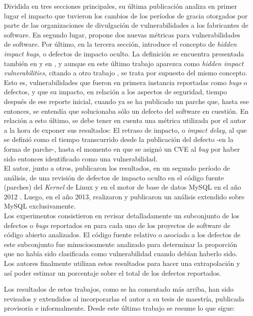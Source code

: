 \documentclass[11pt,a4paper]{article}
\begin{document}
Dividida en tres secciones principales, su última publicación analiza en primer lugar el impacto que tuvieron los cambios de los períodos de gracia otorgados por parte de las organizaciones de divulgación de vulnerabilidades a los fabricantes de software. En segundo lugar, propone dos nuevas métricas para vulnerabilidades de software. Por último, en la tercera sección, introduce el concepto de \textit{hidden impact bugs}, o defectos de impacto oculto. La definición se encuentra presentada también en \cite{Jason2} y en \cite{Jason4}, y aunque en este último trabajo aparezca como \textit{hidden impact vulnerabilities}, citando a otro trabajo \cite{Arnold}, se trata por supuesto del mismo concepto. Esto es, vulnerabilidades que fueron en primera instancia reportadas como \textit{bugs} o defectos, y que su impacto, en relación a los aspectos de seguridad, tiempo después de ese reporte inicial, cuando ya se ha publicado un parche que, hasta ese entonces, se entendía que solucionaba sólo un defecto del software en cuestión. En relación a esto último, se debe tener en cuenta una métrica utilizada por el autor a la hora de exponer sus resultados:  El retraso de impacto, o \textit{impact delay}, al que se definió como el tiempo transcurrido desde la publicación del defecto -en la forma de parche-, hasta el momento en que se asignó un CVE al \textit{bug} por haber sido entonces identificado como una vulnerabilidad.
\\

El autor, junto a otros, publicaron los resultados, en un segundo período de análisis, de una revisión de defectos de impacto oculto en el código fuente (parches) del \textit{Kernel} de Linux y en el motor de base de datos MySQL en el año 2012 \cite{Jason4}. Luego, en el año 2013, realizaron y publicaron \cite{Jason2} un análisis extendido sobre MySQL exclusivamente.
\\

Los experimentos consistieron en revisar detalladamente un subconjunto de los defectos o \textit{bugs} reportados en para cada uno de los proyectos de software de código abierto analizados. El código fuente relativo o asociado a los defectos de este subconjunto fue minuciosamente analizado para determinar la proporción que no había sido clasificada como vulnerabilidad cuando debían haberlo sido. Los autores finalmente utilizan estos resultados para hacer una extrapolación y así poder estimar un porcentaje sobre el total de los defectos reportados.

Los resultados de estos trabajos, como se ha comentado más arriba, han sido revisados y extendidos al incorporarlas el autor a su tesis de maestría, publicada provisoria e informalmente. Desde este último trabajo se resume lo que sigue:
\\
\end{document}
